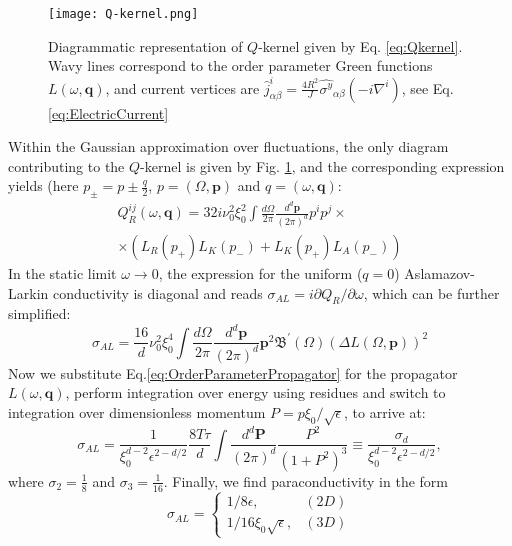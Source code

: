 \documentclass[twocolumn,english,prb]{revtex4-1}
\begin{document}
\begin{figure}
	\centering
	\texttt{[image: Q-kernel.png]}
	\caption{Diagrammatic representation of $Q$-kernel given by Eq. \eqref{eq:Qkernel}. Wavy lines correspond to the order parameter Green functions $L(\omega, \boldsymbol{q})$, and current vertices are $\hat{j}^{i}_{\alpha \beta} = \frac{4 R^2}{J} \hat{\sigma^y}_{\alpha \beta} (-i \nabla^i)$, see Eq. \eqref{eq:ElectricCurrent}}
	\label{fig:Qkernel}
\end{figure}
Within the Gaussian approximation over fluctuations,
the only diagram contributing to the $Q$-kernel is given by Fig. \ref{fig:Qkernel},
 and the corresponding expression yields (here $p_{\pm} = p \pm \frac{q}{2}$, $p = (\Omega, \boldsymbol{p})$ 
and $q = (\omega, \boldsymbol{q})$:
\begin{multline}
\label{eq:QkernelLoop}
Q_{R}^{i j}(\omega,\boldsymbol{q})=32i \nu_0^2 \xi_0^2\int\frac{d\Omega}{2\pi}\frac{d^{d}\boldsymbol{p}}{(2\pi)^{d}}p^i p^j \times\\
\times\left(L_{R}(p_{+})L_{K}(p_{-})+L_{K}(p_{+})L_{A}(p_{-})\right)
\end{multline}
In the static limit $\omega \to 0$, the expression for the uniform ($q=0$) Aslamazov-Larkin conductivity is diagonal and reads $\sigma_{AL} = i \partial Q_R / \partial \omega$, which can be further simplified:
\begin{equation}
\label{eq:Conductivity}
\sigma_{AL} = \frac{16}{d} \nu_0^2 \xi_{0}^{4}\int\frac{d\Omega}{2\pi}\frac{d^d\boldsymbol{p}}{(2\pi)^d}\boldsymbol{p}^{2}\mathfrak{B}^{\prime}(\Omega)(\Delta L(\Omega, \boldsymbol{p}))^{2}
\end{equation}
Now we substitute Eq.\eqref{eq:OrderParameterPropagator} for the propagator $L(\omega,\boldsymbol{q})$, perform integration over energy using residues and switch to integration over dimensionless momentum $P = p \xi_0 / \sqrt{\epsilon}$, to arrive at:
\begin{equation}
\label{eq:ALArbitraryD}
\sigma_{AL} = \frac{1}{\xi_{0}^{d-2}\epsilon^{2-d/2}}\frac{8T\tau}{d}\int\frac{d^{d}\boldsymbol{P}}{(2\pi)^{d}}\frac{P^{2}}{(1+P^{2})^{3}} \equiv \frac{\sigma_d}{\xi_0^{d-2} \epsilon^{2-d/2}},
\end{equation}
where $\sigma_2 = \frac{1}{8}$ and $\sigma_3 = \frac{1}{16}$.  Finally, we find paraconductivity in the form
\begin{equation}
\label{eq:AslamazovLarkin}
\sigma_{AL}=\begin{cases}
1 / 8\epsilon, & (2D)\\
1 / 16\xi_{0}\sqrt{\epsilon}, & (3D)
\end{cases}
\end{equation}
\end{document}
